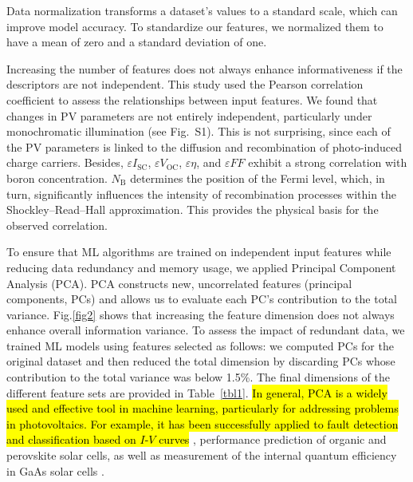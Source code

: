 \documentclass[a4paper,fleqn,draft]{cas-sc}
\begin{document}
Data normalization transforms a dataset's values to a standard scale, which can improve model accuracy.
To standardize our features, we normalized them to have a mean of zero and a standard deviation of one.

Increasing the number of features does not always enhance informativeness if the descriptors are not independent.
This study used the Pearson correlation coefficient to assess the relationships between input features.
We found that changes in PV parameters are not entirely independent, particularly under monochromatic illumination
(see Fig.~S1).
This is not surprising, since each of the PV parameters is linked to the diffusion and recombination of photo-induced charge carriers.
Besides,
$\varepsilon I_\mathrm{SC}$, $\varepsilon V_\mathrm{OC}$, $\varepsilon \eta$, and $\varepsilon F\!F$
exhibit a strong correlation with boron concentration.
$N_\mathrm{B}$ determines the position of the Fermi level, which, in turn, significantly influences
the intensity of recombination processes within the Shockley–Read–Hall approximation.
This provides the physical basis for the observed correlation.

To ensure that ML algorithms are trained on independent input features while reducing data redundancy and memory usage,
we applied Principal Component Analysis (PCA).
PCA constructs new, uncorrelated features (principal components, PCs) and allows us to evaluate each PC's contribution to the total variance.
Fig.\ref{fig2} shows that increasing the feature dimension does not always enhance overall information variance.
To assess the impact of redundant data, we trained ML models using features selected as follows:
we computed PCs for the original dataset and then reduced the total dimension
by discarding PCs whose contribution to the total variance was below 1.5\%.
The final dimensions of the different feature sets are provided in Table~\ref{tbl1}.
\textcolor[rgb]{1.00,0.07,0.00}{
\hl{
In general, PCA is a widely used and effective tool in machine learning,
particularly for addressing problems in photovoltaics.
For example, it has been successfully applied to fault detection and classification based on $I$-$V$ curves} \cite{Fadhel2019, Gao2020},
performance prediction of organic \cite{David2021} and perovskite \cite{Liu2022} solar cells,
as well as measurement of the internal quantum efficiency in GaAs solar cells \cite{AbdullahVetter2025}.
}
\end{document}
